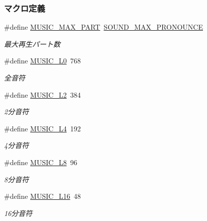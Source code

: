 \subsubsection*{マクロ定義}
\begin{DoxyCompactItemize}
\item 
\#define \hyperlink{music_8h_a219b820b86dd148d59b29a762f1d775a_a219b820b86dd148d59b29a762f1d775a}{M\+U\+S\+I\+C\+\_\+\+M\+A\+X\+\_\+\+P\+A\+R\+T}~\hyperlink{sound_8h_ae37af07d650f8e823223bfaf85dfeea5_ae37af07d650f8e823223bfaf85dfeea5}{S\+O\+U\+N\+D\+\_\+\+M\+A\+X\+\_\+\+P\+R\+O\+N\+O\+U\+N\+C\+E}
\begin{DoxyCompactList}\small\item\em 最大再生パート数 \end{DoxyCompactList}\item 
\#define \hyperlink{music_8h_a5b78950ab14bd552dbb539b8912dada4_a5b78950ab14bd552dbb539b8912dada4}{M\+U\+S\+I\+C\+\_\+\+L0}~768
\begin{DoxyCompactList}\small\item\em 全音符 \end{DoxyCompactList}\item 
\#define \hyperlink{music_8h_a4788b753af96dd3806987f9f43b2808c_a4788b753af96dd3806987f9f43b2808c}{M\+U\+S\+I\+C\+\_\+\+L2}~384
\begin{DoxyCompactList}\small\item\em 2分音符 \end{DoxyCompactList}\item 
\#define \hyperlink{music_8h_a1a06339426dad29d1eeb5a23b4be9726_a1a06339426dad29d1eeb5a23b4be9726}{M\+U\+S\+I\+C\+\_\+\+L4}~192
\begin{DoxyCompactList}\small\item\em 4分音符 \end{DoxyCompactList}\item 
\#define \hyperlink{music_8h_aed1118b9891aebc618d044baeef53056_aed1118b9891aebc618d044baeef53056}{M\+U\+S\+I\+C\+\_\+\+L8}~96
\begin{DoxyCompactList}\small\item\em 8分音符 \end{DoxyCompactList}\item 
\#define \hyperlink{music_8h_ac38d2aa39e73d6bf993e350e43172fc2_ac38d2aa39e73d6bf993e350e43172fc2}{M\+U\+S\+I\+C\+\_\+\+L16}~48
\begin{DoxyCompactList}\small\item\em 16分音符 \end{DoxyCompactList}\item 

\end{DoxyCompactItemize}
